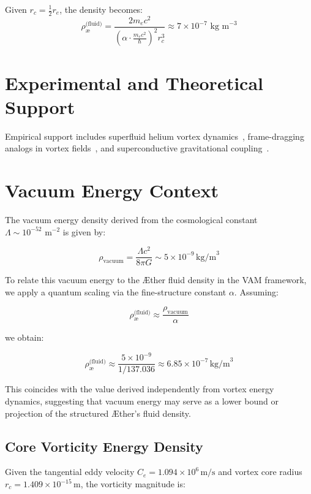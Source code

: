 \documentclass[12pt]{article}
\begin{document}
    Given $r_c = \frac{1}{2} r_e$, the density becomes:
    \[
        \rho_{\text{\ae}}^{\text{(fluid)}} = \frac{2 m_e c^2}{\left(\alpha \cdot \frac{m_e c^2}{\hbar}\right)^2 r_c^3} \approx 7 \times 10^{-7} \text{ kg m}^{-3}
    \]

    \section{Experimental and Theoretical Support}

    Empirical support includes superfluid helium vortex dynamics~\cite{jackson2021}, frame-dragging analogs in vortex fields~\cite{paris2015}, and superconductive gravitational coupling~\cite{santiago2011}.

    \section{Vacuum Energy Context}

    The vacuum energy density derived from the cosmological constant \( \Lambda \sim 10^{-52} \text{ m}^{-2} \) is given by:

    \[
        \rho_{\text{vacuum}} = \frac{\Lambda c^2}{8 \pi G} \sim 5 \times 10^{-9} \, \text{kg/m}^3
    \]

    To relate this vacuum energy to the \AE{}ther fluid density in the VAM framework, we apply a quantum scaling via the fine-structure constant \( \alpha \). Assuming:

    \[
        \rho_{\text{\ae}}^{\text{(fluid)}} \approx \frac{\rho_{\text{vacuum}}}{\alpha}
    \]

    we obtain:

    \[
        \rho_{\text{\ae}}^{\text{(fluid)}} \approx \frac{5 \times 10^{-9}}{1/137.036} \approx 6.85 \times 10^{-7} \, \text{kg/m}^3
    \]

    This coincides with the value derived independently from vortex energy dynamics, suggesting that vacuum energy may serve as a lower bound or projection of the structured \AE{}ther's fluid density.

    \subsection{Core Vorticity Energy Density}

    Given the tangential eddy velocity $C_e = 1.094 \times 10^6 \, \text{m/s}$ and vortex core radius $r_c = 1.409 \times 10^{-15} \, \text{m}$, the vorticity magnitude is:
\end{document}
